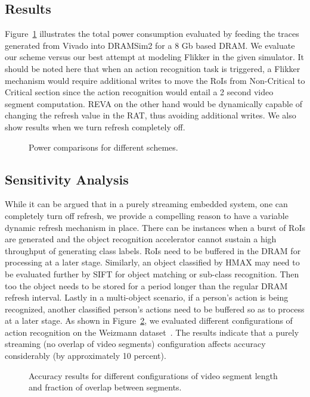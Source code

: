 \subsection{Results}
Figure~\ref{fig:PowerResults} illustrates the total power consumption evaluated by feeding the traces generated from Vivado into DRAMSim2 for a 8 Gb based DRAM. We evaluate our scheme versus our best attempt at modeling Flikker in the given simulator. It should be noted here that when an action recognition task is triggered, a Flikker mechanism would require additional writes to move the RoIs from Non-Critical to Critical section since the action recognition would entail a 2 second video segment computation. REVA on the other hand would be dynamically capable of changing the refresh value in the RAT, thus avoiding additional writes. We also show results when we turn refresh completely off. 

\begin{figure}[ht!]
\centering
{}
\caption{\label{fig:PowerResults} Power comparisons for different schemes.}
\end{figure}

\subsection{Sensitivity Analysis}
While it can be argued that in a purely streaming embedded system, one can completely turn off refresh, we provide a compelling reason to have a variable dynamic refresh mechanism in place. There can be instances when a burst of RoIs are generated and the object recognition accelerator cannot sustain a high throughput of generating class labels. RoIs need to be buffered in the DRAM for processing at a later stage. Similarly, an object classified by HMAX may need to be evaluated further by SIFT for object matching or sub-class recognition. Then too the object needs to be stored for a period longer than the regular DRAM refresh interval. Lastly in a multi-object scenario, if a person's action is being recognized, another classified person's actions need to be buffered so as to process at a later stage. As shown in Figure~\ref{fig:ActionRecognition}, we evaluated different configurations of action recognition on the Weizmann dataset~\cite{Weizmann}. The results indicate that a purely streaming (no overlap of video segments) configuration affects accuracy considerably (by approximately 10 percent).  

\begin{figure}[ht!]
\centering
{}
\caption{\label{fig:ActionRecognition} Accuracy results for different configurations of video segment length and fraction of overlap between segments.}
\end{figure}


